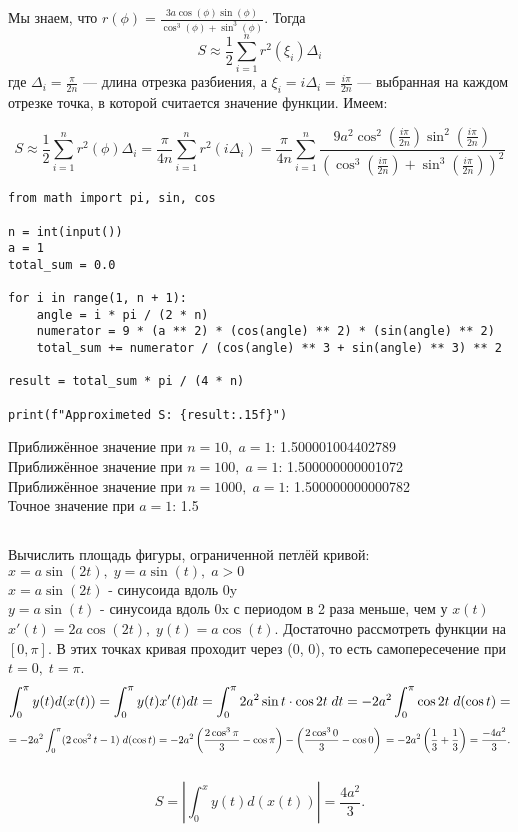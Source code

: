 \noindent Мы знаем, что \( r(\phi) = \frac{3a\cos(\phi)\sin(\phi)}{\cos^3(\phi)+\sin^3(\phi)} \).
\noindent Тогда \[ S \approx \frac{1}{2} \sum_{i=1}^n r^2(\xi_i) \Delta_i \] где \( \Delta_i = \frac{\pi}{2n} \) — длина отрезка разбиения, а \( \xi_i = i \Delta_i = \frac{i\pi}{2n} \) — выбранная на каждом отрезке точка, в которой считается значение функции. Имеем:

\[
S \approx \frac{1}{2} \sum_{i=1}^n r^2(\phi) \Delta_i = \frac{\pi}{4n} \sum_{i=1}^n r^2(i \Delta_i) = \frac{\pi}{4n} \sum_{i=1}^n \frac{9a^2 \cos^2\left(\frac{i\pi}{2n}\right) \sin^2\left(\frac{i\pi}{2n}\right)}{\left(\cos^3\left(\frac{i\pi}{2n}\right)+\sin^3\left(\frac{i\pi}{2n}\right)\right)^2}
\]
\begin{verbatim}
from math import pi, sin, cos

n = int(input())
a = 1
total_sum = 0.0

for i in range(1, n + 1):
    angle = i * pi / (2 * n)
    numerator = 9 * (a ** 2) * (cos(angle) ** 2) * (sin(angle) ** 2)
    total_sum += numerator / (cos(angle) ** 3 + sin(angle) ** 3) ** 2

result = total_sum * pi / (4 * n)

print(f"Approximeted S: {result:.15f}")
\end{verbatim}
Приближённое значение при $n=10, \; a=1$: 1.500001004402789\\
Приближённое значение при $n=100, \; a=1$: 1.500000000001072\\
Приближённое значение при $n=1000, \; a=1$: 1.500000000000782 \\
Точное значение при $a = 1$: 1.5\
\subsection{}
Вычислить площадь фигуры, ограниченной петлёй кривой: \\
$x=a\sin(2t), \; y=a\sin(t), \; a>0$ \\

\noindent $x=a\sin(2t)$ - синусоида вдоль 0y \\
$y = a\sin(t)$ - синусоида вдоль 0x с периодом в 2 раза меньше, чем у $x(t)$ \\
$x'(t) = 2a\cos(2t), \; y(t) = a\cos(t)$. Достаточно рассмотреть функции на $[0, \pi]$. В этих точках кривая проходит через (0, 0), то есть самопересечение при $t = 0, \; t=\pi$.
\[
\int_{0}^{\pi} y(t) d(x(t)) = \int_{0}^{\pi} y(t) x'(t) dt = \int_{0}^{\pi} 2a^2 \sin t \cdot \cos 2t \; dt \\
= -2a^2 \int_{0}^{\pi} \cos 2t \; d(\cos t) =\]
\[= -2a^2 \int_{0}^{\pi} (2\cos^2 t - 1) \; d(\cos t) \\
= -2a^2 \left( \frac{2 \cos^3 \pi}{3} - \cos \pi \right) - \left( \frac{2 \cos^3 0}{3} - \cos 0 \right) \\
= -2a^2 \left( \frac{1}{3} + \frac{1}{3} \right) = \frac{-4a^2}{3}.\] \\
\[S = \left| \int_{0}^{x} y(t) d(x(t)) \right| = \frac{4a^2}{3}.
\]
